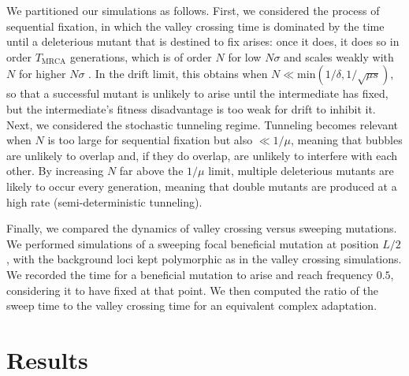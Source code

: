 \documentclass[rmp]{revtex4}
\begin{document}
We partitioned our simulations as follows.
First, we considered the process of sequential fixation, in which the valley crossing time is dominated by the time until a deleterious mutant that is destined to fix arises: once it does, it does so in order $T_{\mathrm{MRCA}}$ generations, which is of order $N$ for low $N\sigma$ and scales weakly with $N$ for higher $N\sigma$ \citep{neher_hallatschek_2013}.
In the drift limit, this obtains when $N \ll \mathrm{min}(1/\delta, 1/\sqrt{\mu s})$, so that a successful mutant is unlikely to arise until the intermediate has fixed, but the intermediate's fitness disadvantage is too weak for drift to inhibit it.
Next, we considered the stochastic tunneling regime.
Tunneling becomes relevant when $N$ is too large for sequential fixation but also $\ll 1/\mu$, meaning that bubbles are unlikely to overlap and, if they do overlap, are unlikely to interfere with each other.
By increasing $N$ far above the $1/\mu$ limit, multiple deleterious mutants are likely to occur every generation, meaning that double mutants are produced at a high rate (semi-deterministic tunneling).

Finally, we compared the dynamics of valley crossing versus sweeping mutations.
We performed simulations of a sweeping focal beneficial mutation at position $L/2$, with the background loci kept polymorphic as in the valley crossing simulations.
We recorded the time for a beneficial mutation to arise and reach frequency $0.5$, considering it to have fixed at that point.
We then computed the ratio of the sweep time to the valley crossing time for an equivalent complex adaptation.

\section*{Results}
\end{document}
